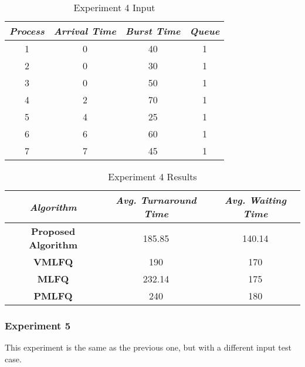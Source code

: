\documentclass[conference]{IEEEtran}
\newcommand\T{\rule{0pt}{2.6ex}}       %
\newcommand\B{\rule[-1.2ex]{0pt}{0pt}} %
\begin{document}
\begin{table}[H]
    \caption{Experiment 4 Input}
    \centering
     \begin{tabular}{||c c c c||} 
     \hline
     \textit{\textbf{Process}} & \textit{\textbf{Arrival Time}} & \textit{\textbf{Burst Time}} & \textit{\textbf{Queue}} \T \B \\ 
     \hline
     \hline
     1 & 0 & 40 & 1 \T \B \\ 
     \hline
     2 & 0 & 30 & 1 \T \B \\
     \hline
     3 & 0 & 50 & 1 \T \B \\
     \hline
     4 & 2 & 70 & 1 \T \B \\
     \hline
     5 & 4 & 25 & 1 \T \B \\ 
     \hline
     6 & 6 & 60 & 1 \T \B \\ 
     \hline
     7 & 7 & 45 & 1 \T \B \\ 
     \hline
     \end{tabular}
\end{table}

\begin{table}[H]
    \caption{Experiment 4 Results}
    \centering
    \begin{tabular}{||c c c||}
        \hline
        \textit{\textbf{Algorithm}} & \textit{\textbf{Avg. Turnaround Time}} & \textit{\textbf{Avg. Waiting Time}}\T \B \\
    \hline
    \hline
    \textbf{Proposed Algorithm} & 185.85 & 140.14 \T \B\\ \hline
    \textbf{VMLFQ} & 190 & 170 \T \B\\ \hline
    \textbf{MLFQ} & 232.14 & 175 \T \B\\ \hline
    \textbf{PMLFQ} & 240 & 180 \T \B\\ \hline
     \end{tabular}
\end{table}

\subsubsection{Experiment 5}

This experiment is the same as the previous one, but with a different input test case. 
\end{document}
